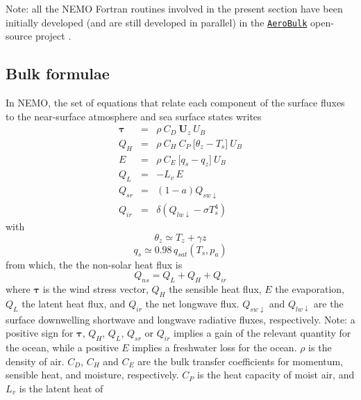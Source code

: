 \documentclass[../main/NEMO_manual]{subfiles}
\begin{document}

Note: all the NEMO Fortran routines involved in the present section have been
 initially developed (and are still developed in parallel) in
 the \href{https://brodeau.github.io/aerobulk/}{\texttt{AeroBulk}} open-source project
\citep{brodeau.barnier.ea_JPO17}.

\subsection{Bulk formulae}\label{subsec:SBC_blkform}
%
In NEMO, the set of equations that relate each component of the surface fluxes
to the near-surface atmosphere and sea surface states writes
%
\begin{subequations}\label{eq_bulk}
  \label{eq:SBC_bulk_form}
  \begin{eqnarray}
    \mathbf{\tau} &=& \rho~ C_D ~ \mathbf{U}_z  ~ U_B \\
    Q_H           &=& \rho~C_H~C_P~\big[ \theta_z - T_s \big] ~ U_B \\
    E             &=& \rho~C_E    ~\big[    q_s   - q_z \big] ~ U_B \\
    Q_L           &=& -L_v \, E \\
    Q_{sr}        &=& (1 - a) Q_{sw\downarrow} \\
    Q_{ir}        &=& \delta (Q_{lw\downarrow} -\sigma T_s^4)
  \end{eqnarray}
\end{subequations}
%
with
   \[ \theta_z \simeq T_z+\gamma z \]
   \[  q_s \simeq 0.98\,q_{sat}(T_s,p_a ) \]
%
from which, the the non-solar heat flux is \[ Q_{ns} = Q_L + Q_H + Q_{ir} \]
%
where $\mathbf{\tau}$ is the wind stress vector, $Q_H$ the sensible heat flux,
$E$ the evaporation, $Q_L$ the latent heat flux, and $Q_{ir}$ the net longwave
flux.
%
$Q_{sw\downarrow}$ and $Q_{lw\downarrow}$ are the surface downwelling shortwave
and longwave radiative fluxes, respectively.
%
Note: a positive sign for $\mathbf{\tau}$, $Q_H$, $Q_L$, $Q_{sr}$ or $Q_{ir}$
implies a gain of the relevant quantity for the ocean, while a positive $E$
implies a freshwater loss for the ocean.
%
$\rho$ is the density of air. $C_D$, $C_H$ and $C_E$ are the bulk transfer
coefficients for momentum, sensible heat, and moisture, respectively.
%
$C_P$ is the heat capacity of moist air, and $L_v$ is the latent heat of
\end{document}
